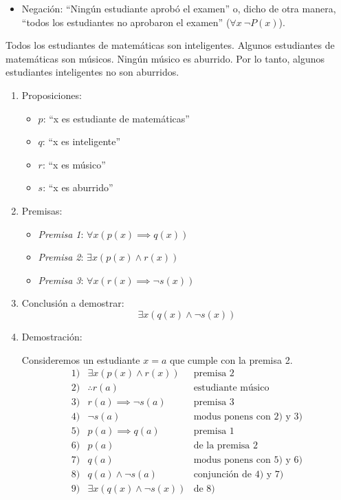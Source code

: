 \begin{enumerate}[label=\roman*)]
\begin{fmd-example}
\begin{itemize}
		\item Negación: ``Ningún estudiante aprobó el examen'' o, dicho de otra manera, ``todos los estudiantes no aprobaron el examen'' ($\forall x \ \neg P(x)$).
		\end{itemize}
	\end{fmd-example}
\end{enumerate}


\begin{fmd-example}
	Todos los estudiantes de matemáticas son inteligentes. Algunos estudiantes de matemáticas son músicos. Ningún músico es aburrido. Por lo tanto, algunos estudiantes inteligentes no son aburridos.
	
	\begin{enumerate}
		\item Proposiciones:
		\begin{itemize}[label={}]
			\item $p$: ``x es estudiante de matemáticas''
			\item $q$: ``x es inteligente''
			\item $r$: ``x es músico''
			\item $s$: ``x es aburrido''
		\end{itemize}
		\item Premisas:
		\begin{itemize}[label={}]
			\item \textit{Premisa 1}: $ \forall x \left(p(x) \implies q(x)\right) $
			\item \textit{Premisa 2}: $ \exists x \left(p(x) \land r(x) \right) $
			\item \textit{Premisa 3}: $ \forall x \left(r(x) \implies \neg s(x)\right) $
		\end{itemize}
		\item Conclusión a demostrar: \[ \exists x \left( q(x) \land \neg s(x) \right) \]
		\item Demostración:
		
		Consideremos un estudiante $x=a$ que cumple con la premisa 2.
		\[
		\begin{array}{lll}
			1) & \exists x \left( p(x) \land r(x) \right) & \text{premisa 2}\\
			2) & \therefore r(a) & \text{estudiante músico}\\
			3) & r(a) \implies \neg s(a) & \text{premisa 3} \\
			4) & \neg s(a) & \text{modus ponens con 2) y 3)} \\
			5) & p(a) \implies q(a) & \text{premisa 1} \\
			6) & p(a) & \text{de la premisa 2}\\
			7) & q(a) & \text{modus ponens con 5) y 6)}\\
			8) & q(a) \land \neg s(a) & \text{conjunción de 4) y 7)}\\
			9) & \exists x \left( q(x) \land \neg s(x) \right) & \text{de 8)}
		\end{array}
		\]
	\end{enumerate}
	
\end{fmd-example}

